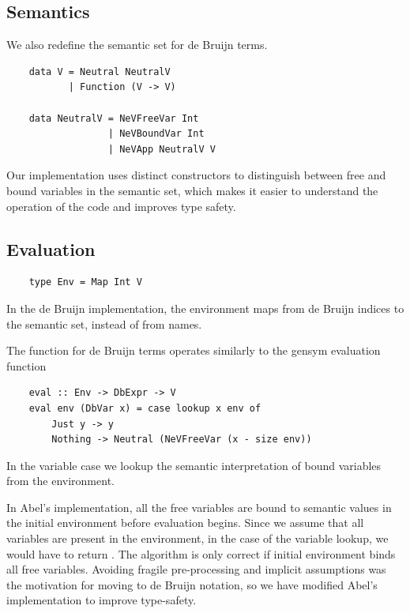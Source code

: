\subsection{Semantics}

We also redefine the semantic set for de Bruijn terms.

\begin{lstlisting}
    data V = Neutral NeutralV
           | Function (V -> V)

    data NeutralV = NeVFreeVar Int
                  | NeVBoundVar Int
                  | NeVApp NeutralV V
\end{lstlisting}

Our implementation uses distinct constructors to distinguish between free and bound variables in the semantic set, which makes it easier to understand the operation of the code and improves type safety.


\subsection{Evaluation}

\begin{lstlisting}
    type Env = Map Int V
\end{lstlisting}

In the de Bruijn implementation, the environment maps from de Bruijn indices to the semantic set, instead of from names.

The  function for de Bruijn terms operates similarly to the gensym evaluation function

\begin{lstlisting}
    eval :: Env -> DbExpr -> V
    eval env (DbVar x) = case lookup x env of
        Just y -> y
        Nothing -> Neutral (NeVFreeVar (x - size env))
\end{lstlisting}

In the variable case we lookup the semantic interpretation of bound variables from the environment. 

In Abel's implementation, all the free variables are bound to semantic values in the initial environment before evaluation begins. Since we assume that all variables are present in the environment, in the  case of the variable lookup, we would have to return . The algorithm is only correct if initial environment binds all free variables. Avoiding fragile pre-processing and implicit assumptions was the motivation for moving to de Bruijn notation, so we have modified Abel's implementation to improve type-safety.

